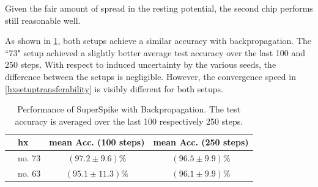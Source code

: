 Given the fair amount of spread in the resting potential, the second chip performs still reasonable well.

As shown in \cref{backpropresults}, both setups achieve a similar accuracy with backpropagation. The ``73" setup achieved a slightly better average test accuracy over the last 100 and 250 steps. With respect to induced uncertainty by the various seeds, the difference between the setups is negligible. However, the convergence speed in \cref{hxsetuptransferability} is visibly different for both setups. 
\begin{table}[h!]\centering{}
	\begin{tabular}{@{}rlcc@{}}\toprule
		& \gls{hx}& mean Acc. (100 steps)	 & 	mean Acc. (250 steps) \\ \midrule
		& no. 73			& 	 $(97.2 \pm 9.6) \%$ & 	$(96.5 \pm 9.9) \%$\\
		& no. 63			&	$(95.1 \pm 11.3) \%$ & 	$(96.1 \pm 9.9) \%$\\
		\bottomrule
	\end{tabular}
	\caption[Performance of SuperSpike with Backpropagation.]{Performance of SuperSpike with Backpropagation. The test accuracy is averaged over the last 100 respectively 250 steps.}
	\label{backpropresults}
\end{table}

